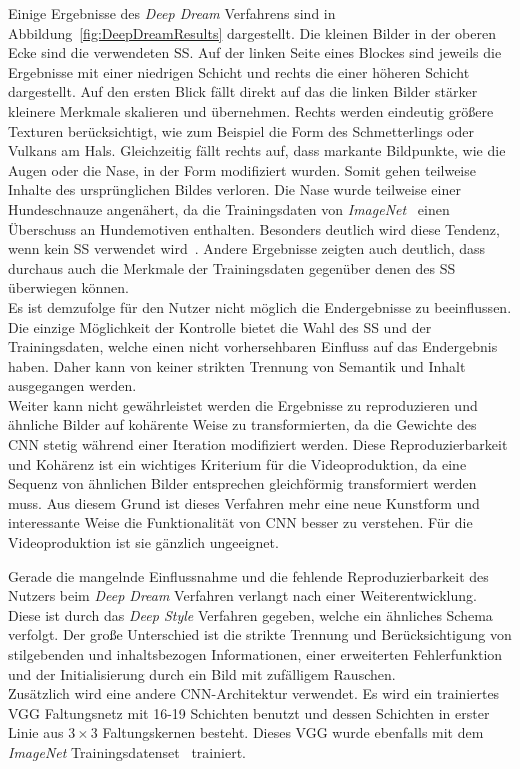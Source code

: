 \documentclass[times, 11pt,twocolumn]{article}
\begin{document}
Einige Ergebnisse des \textit{Deep Dream} Verfahrens sind in Abbildung~\ref{fig:DeepDreamResults} dargestellt. Die kleinen Bilder in der oberen Ecke sind die verwendeten SS. Auf der linken Seite eines Blockes sind jeweils die Ergebnisse mit einer niedrigen Schicht und rechts die einer höheren Schicht dargestellt. Auf den ersten Blick fällt direkt auf das die linken Bilder stärker kleinere Merkmale skalieren und übernehmen. Rechts werden eindeutig größere Texturen berücksichtigt, wie zum Beispiel die Form des Schmetterlings oder Vulkans am Hals. Gleichzeitig fällt rechts auf, dass markante Bildpunkte, wie die Augen oder die Nase, in der Form modifiziert wurden. Somit gehen teilweise Inhalte des ursprünglichen Bildes verloren. Die Nase wurde teilweise einer Hundeschnauze angenähert, da die Trainingsdaten von \textit{ImageNet}~\cite{ImageNet} einen Überschuss an Hundemotiven enthalten. Besonders deutlich wird diese Tendenz, wenn kein SS verwendet wird~\cite{McCaigDG16}. Andere Ergebnisse zeigten auch deutlich, dass durchaus auch die Merkmale der Trainingsdaten gegenüber denen des SS überwiegen können.
\\
Es ist demzufolge für den Nutzer nicht möglich die Endergebnisse zu beeinflussen. Die einzige Möglichkeit der Kontrolle bietet die Wahl des SS und der Trainingsdaten, welche einen nicht vorhersehbaren Einfluss auf das Endergebnis haben. Daher kann von keiner strikten Trennung von Semantik und Inhalt ausgegangen werden. \\
Weiter kann nicht gewährleistet werden die Ergebnisse zu reproduzieren und ähnliche Bilder auf kohärente  Weise zu transformierten, da die Gewichte des CNN stetig während einer Iteration modifiziert werden. Diese Reproduzierbarkeit und Kohärenz ist ein wichtiges Kriterium für die Videoproduktion, da eine Sequenz von ähnlichen Bilder entsprechen gleichförmig transformiert werden muss. Aus diesem Grund ist dieses Verfahren mehr eine neue Kunstform und interessante Weise die Funktionalität von CNN besser zu verstehen. Für die Videoproduktion ist sie gänzlich ungeeignet.



\label{sec:DeepStyle}
Gerade die mangelnde Einflussnahme und die fehlende Reproduzierbarkeit des Nutzers beim \textit{Deep Dream} Verfahren \cite{DeepDream} verlangt nach einer Weiterentwicklung. Diese ist durch das \textit{Deep Style} Verfahren \cite{GatysEB15a} gegeben, welche ein ähnliches Schema verfolgt. Der große Unterschied ist die strikte Trennung und Berücksichtigung von stilgebenden und inhaltsbezogen Informationen, einer erweiterten Fehlerfunktion und der Initialisierung durch ein Bild mit zufälligem Rauschen.\\
Zusätzlich wird eine andere CNN-Architektur verwendet. Es wird ein trainiertes VGG Faltungsnetz \cite{SimonyanZ14a} mit 16-19 Schichten benutzt und dessen Schichten in erster Linie aus $3\times3$ Faltungskernen besteht. Dieses VGG wurde ebenfalls mit dem \textit{ImageNet} Trainingsdatenset~\cite{ImageNet} trainiert.
\end{document}
